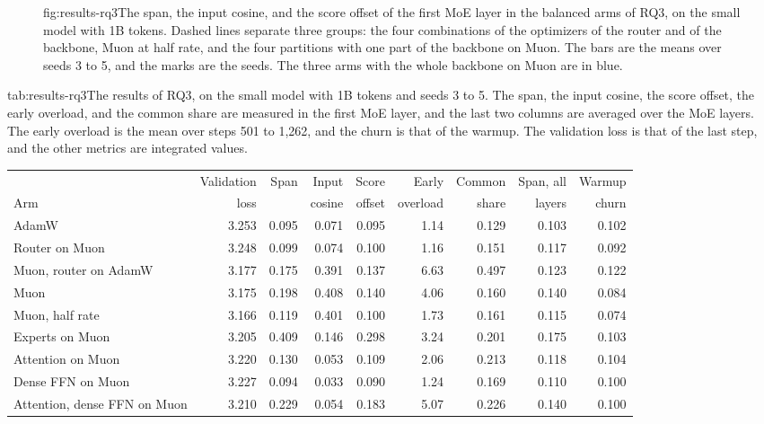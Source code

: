 \begin{figure}[The first MoE layer in the balanced arms of RQ3]{fig:results-rq3}{The span, the input cosine, and the score offset of the first MoE layer in the balanced arms of RQ3, on the small model with 1B tokens. Dashed lines separate three groups: the four combinations of the optimizers of the router and of the backbone, Muon at half rate, and the four partitions with one part of the backbone on Muon. The bars are the means over seeds 3 to 5, and the marks are the seeds. The three arms with the whole backbone on Muon are in blue.}
  
\end{figure}

\begin{table}[The results of RQ3]{tab:results-rq3}{The results of RQ3, on the small model with 1B tokens and seeds 3 to 5. The span, the input cosine, the score offset, the early overload, and the common share are measured in the first MoE layer, and the last two columns are averaged over the MoE layers. The early overload is the mean over steps 501 to 1,262, and the churn is that of the warmup. The validation loss is that of the last step, and the other metrics are integrated values.}
  \small
  \begin{tabular}{lrrrrrrrr}
    \toprule
                                    & Validation & Span    & Input   & Score   & Early    & Common  & Span, all & Warmup \\
    Arm                             & loss       &         & cosine  & offset  & overload & share   & layers    & churn  \\
    \midrule
    AdamW                           & 3.253      & 0.095   & 0.071   & 0.095   & 1.14     & 0.129   & 0.103     & 0.102  \\
    Router on Muon                  & 3.248      & 0.099   & 0.074   & 0.100   & 1.16     & 0.151   & 0.117     & 0.092  \\
    Muon, router on AdamW           & 3.177      & 0.175   & 0.391   & 0.137   & 6.63     & 0.497   & 0.123     & 0.122  \\
    Muon                            & 3.175      & 0.198   & 0.408   & 0.140   & 4.06     & 0.160   & 0.140     & 0.084  \\
    Muon, half rate                 & 3.166      & 0.119   & 0.401   & 0.100   & 1.73     & 0.161   & 0.115     & 0.074  \\
    Experts on Muon                 & 3.205      & 0.409   & 0.146   & 0.298   & 3.24     & 0.201   & 0.175     & 0.103  \\
    Attention on Muon               & 3.220      & 0.130   & 0.053   & 0.109   & 2.06     & 0.213   & 0.118     & 0.104  \\
    Dense FFN on Muon               & 3.227      & 0.094   & 0.033   & 0.090   & 1.24     & 0.169   & 0.110     & 0.100  \\
    Attention, dense FFN on Muon    & 3.210      & 0.229   & 0.054   & 0.183   & 5.07     & 0.226   & 0.140     & 0.100  \\
    \bottomrule
  \end{tabular}
\end{table}

